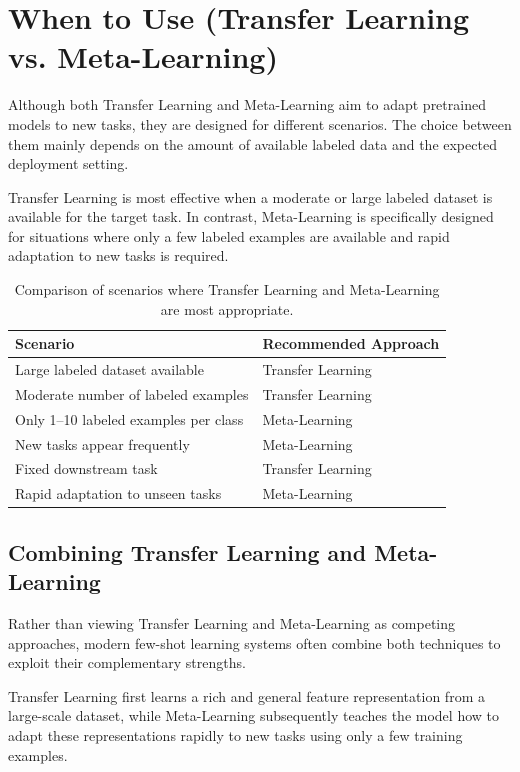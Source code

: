 \section{When to Use (Transfer Learning vs. Meta-Learning)}

Although both Transfer Learning and Meta-Learning aim to adapt pretrained models to new tasks, they are designed for different scenarios. The choice between them mainly depends on the amount of available labeled data and the expected deployment setting.

Transfer Learning is most effective when a moderate or large labeled dataset is available for the target task. In contrast, Meta-Learning is specifically designed for situations where only a few labeled examples are available and rapid adaptation to new tasks is required.

\begin{table}[H]
\centering

\renewcommand{\arraystretch}{1.3}

\begin{tabular}{|p{7cm}|p{5cm}|}
\hline
\textbf{Scenario} & \textbf{Recommended Approach} \\
\hline
Large labeled dataset available & Transfer Learning \\
\hline
Moderate number of labeled examples & Transfer Learning \\
\hline
Only 1--10 labeled examples per class & Meta-Learning \\
\hline
New tasks appear frequently & Meta-Learning \\
\hline
Fixed downstream task & Transfer Learning \\
\hline
Rapid adaptation to unseen tasks & Meta-Learning \\
\hline
\end{tabular}
\caption{Comparison of scenarios where Transfer Learning and Meta-Learning are most appropriate.}
\label{tab:transfer_vs_meta}
\end{table}

\subsection*{Combining Transfer Learning and Meta-Learning}

Rather than viewing Transfer Learning and Meta-Learning as competing approaches, modern few-shot learning systems often combine both techniques to exploit their complementary strengths.

Transfer Learning first learns a rich and general feature representation from a large-scale dataset, while Meta-Learning subsequently teaches the model how to adapt these representations rapidly to new tasks using only a few training examples.

